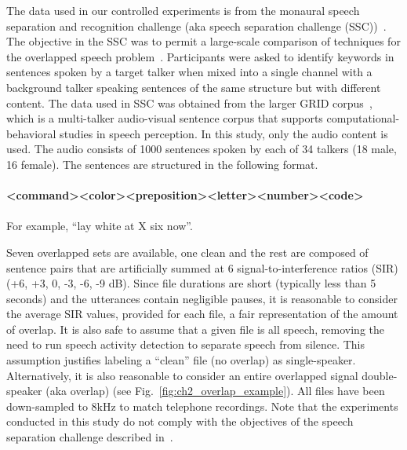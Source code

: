 The data used in our controlled experiments is from the monaural speech separation and recognition challenge (aka speech separation challenge (SSC))~\cite{cooke20101}. 
The objective in the SSC was to permit a large-scale comparison of techniques for the overlapped speech problem~\cite{cooke20101}. 
Participants were asked to identify keywords in sentences spoken by a target talker when mixed into a single channel with a background talker speaking sentences of the same structure but with different content. 
The data used in SSC was obtained from the larger GRID corpus~\cite{cooke_JASA_SSCD}, which is a multi-talker audio-visual sentence corpus that supports computational-behavioral studies in speech perception. 
In this study, only the audio content is used. 
The audio consists of 1000 sentences spoken by each of 34 talkers (18 male, 16 female). The sentences are structured in the following format.
\\\\
{\small \bf \textless command\textgreater\textless color\textgreater\textless preposition\textgreater\textless letter\textgreater\textless number\textgreater\textless code\textgreater}
\\\\
For example, ``lay white at X six now''.

Seven overlapped sets are available, one clean and the rest are composed of sentence pairs that are artificially summed at 6 signal-to-interference ratios (SIR) (+6, +3, 0, -3, -6, -9 dB). 
Since file durations are short (typically less than 5 seconds) and the utterances contain negligible pauses, it is reasonable to consider the average SIR values, provided for each file, a fair representation of the amount of overlap. 
It is also safe to assume that a given file is all speech, removing the need to run speech activity detection to separate speech from silence. 
This assumption justifies labeling a ``clean'' file (no overlap) as single-speaker. 
Alternatively, it is also reasonable to consider an entire overlapped signal double-speaker (aka overlap) (see Fig.~\ref{fig:ch2_overlap_example}). 
All files have been down-sampled to 8kHz to match telephone recordings. 
Note that the experiments conducted in this study do not comply with the objectives of the speech separation challenge described in~\cite{SSC_link}. 

